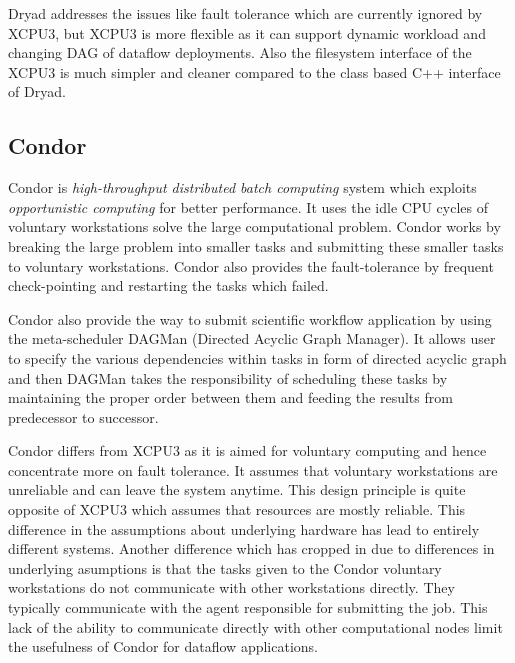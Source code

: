 Dryad addresses the issues like fault tolerance which are currently ignored by
XCPU3, but XCPU3 is more flexible as it can support dynamic workload and
changing DAG of dataflow deployments. Also the filesystem interface of the XCPU3
is much simpler and cleaner compared to the class based C++ interface of Dryad.

\subsection{Condor}
Condor\cite{condor-practice} is \textit{high-throughput distributed batch
computing} system which exploits \textit{opportunistic computing} for better
performance. It uses the idle CPU cycles of voluntary workstations solve the
large computational problem.
Condor works by breaking the large problem into smaller tasks and submitting
these smaller tasks to voluntary workstations.  Condor also provides the
fault-tolerance by frequent check-pointing and restarting the tasks which
failed.

Condor also provide the way to submit scientific workflow application by using
the meta-scheduler DAGMan (Directed Acyclic Graph Manager).  It allows user to
specify the various dependencies within tasks in form of directed acyclic graph
and then DAGMan takes the responsibility of scheduling these tasks by
maintaining the proper order between them and feeding the results from
predecessor to successor.

Condor differs from XCPU3 as it is aimed for voluntary computing and hence
concentrate more on fault tolerance.  It assumes that voluntary workstations
are unreliable and can leave the system anytime.  This design principle is
quite opposite of XCPU3 which assumes that resources are mostly reliable.  This
difference in the assumptions about underlying hardware has lead to entirely
different systems.  Another difference which has cropped in due to differences
in underlying asumptions is that the tasks given to the Condor voluntary
workstations do not communicate with other workstations directly.  They
typically communicate with the agent responsible for submitting the job.  This
lack of the ability to communicate directly with other computational nodes
limit the usefulness of Condor for dataflow applications.

